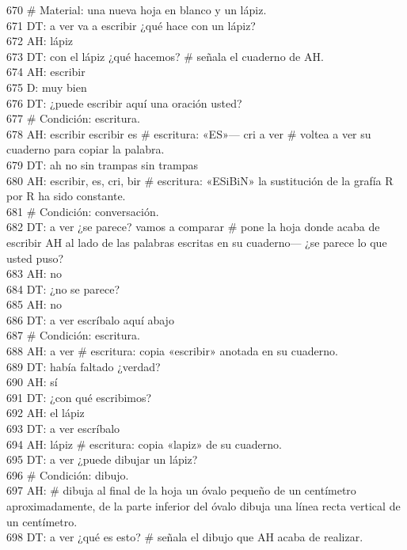 670 \# Material: una nueva hoja en blanco y un lápiz.\\
671 DT: a ver va a escribir ¿qué hace con un lápiz?\\
672 AH: lápiz\\
673 DT: con el lápiz ¿qué hacemos? \# señala el cuaderno de AH.\\
674 AH: escribir\\
675 D: muy bien\\
676 DT: ¿puede escribir aquí una oración usted?\\
677 \# Condición: escritura.\\
678 AH: escribir escribir es \# escritura: «ES»--- cri a ver \# voltea a ver su cuaderno para copiar la palabra. \\
679 DT: ah no sin trampas sin trampas\\
680 AH: escribir, es, cri, bir \# escritura: «ESiBiN» la sustitución de la grafía R por R ha sido constante.\\
681 \# Condición: conversación.\\
682 DT: a ver ¿se parece? vamos a comparar \# pone la hoja donde acaba de escribir AH al lado de las palabras escritas en su cuaderno--- ¿se parece lo que usted puso?\\
683 AH: no\\
684 DT: ¿no se parece?\\
685 AH: no\\
686 DT: a ver escríbalo aquí abajo\\
687 \# Condición: escritura.\\
688 AH: a ver \# escritura: copia «escribir» anotada en su cuaderno.\\
689 DT: había faltado ¿verdad?\\
690 AH: sí\\
691 DT: ¿con qué escribimos?\\
692 AH: el lápiz\\
693 DT: a ver escríbalo\\
694 AH: lápiz \# escritura: copia «lapiz» de su cuaderno.\\
695 DT: a ver ¿puede dibujar un lápiz?\\
696 \# Condición: dibujo.\\
697 AH: \# dibuja al final de la hoja un óvalo pequeño de un centímetro aproximadamente, de la parte inferior del óvalo dibuja una línea recta vertical de un centímetro.\\
698 DT: a ver ¿qué es esto? \# señala el dibujo que AH acaba de realizar.\\
